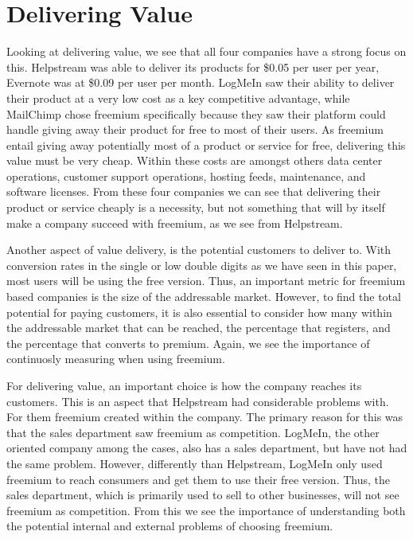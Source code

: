 \section{Delivering Value}

Looking at delivering value, we see that all four companies have a strong focus on this. Helpstream was able to deliver its products for \$0.05 per user per year, Evernote was at \$0.09 per user per month. LogMeIn saw their ability to deliver their product at a very low cost as a key competitive advantage, while MailChimp chose freemium specifically because they saw their platform could handle giving away their product for free to most of their users. As freemium entail giving away potentially most of a product or service for free, delivering this value must be very cheap. Within these costs are amongst others data center operations, customer support operations, hosting feeds, maintenance, and software licenses. From these four companies we can see that delivering their product or service cheaply is a necessity, but not something that will by itself make a company succeed with freemium, as we see from Helpstream.


Another aspect of value delivery, is the potential customers to deliver to. With conversion rates in the single or low double digits as we have seen in this paper, most users will be using the free version. Thus, an important metric for freemium based companies is the size of the addressable market. However, to find the total potential for paying customers, it is also essential to consider how many within the addressable market that can be reached, the percentage that registers, and the percentage that converts to premium. Again, we see the importance of continuosly measuring when using freemium.


For delivering value, an important choice is how the company reaches its customers. This is an aspect that Helpstream had considerable problems with. For them freemium created  within the company. The primary reason for this was that the sales department saw freemium as competition. LogMeIn, the other  oriented company among the cases, also has a sales department, but have not had the same problem. However, differently than Helpstream, LogMeIn only used freemium to reach consumers and get them to use their free version. Thus, the sales department, which is primarily used to sell to other businesses, will not see freemium as competition. From this we see the importance of understanding both the potential internal and external problems of choosing freemium.

